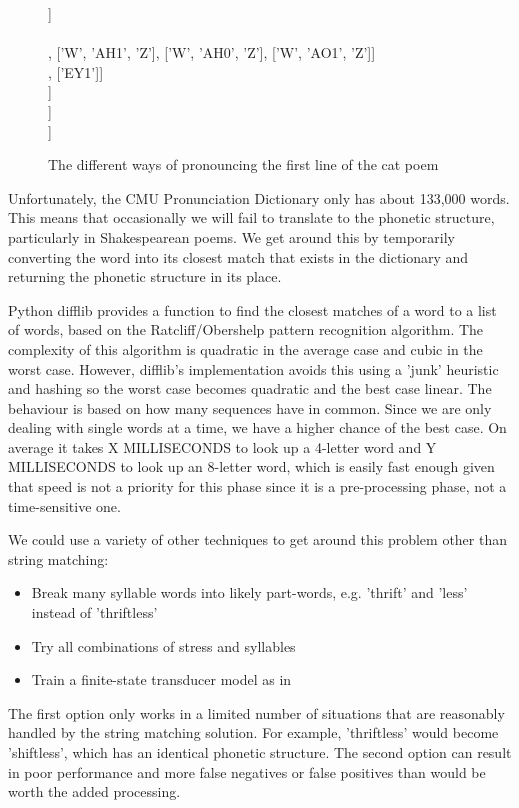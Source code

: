 \begin{figure}
\centering
[['DH', 'EH1', 'R']] \\
['W', 'AH1', 'N', 'S']\\
[['W', 'AA1', 'Z'], ['W', 'AH1', 'Z'], ['W', 'AH0', 'Z'], ['W', 'AO1', 'Z']]\\
[['AH0'], ['EY1']]\\
[['B', 'IH1', 'G']]\\
[['B', 'R', 'AW1', 'N']]\\
[['K', 'AE1', 'T']]
\caption{The different ways of pronouncing the first line of the cat poem}
\label{fig:catpronun}
\end{figure}

Unfortunately, the CMU Pronunciation Dictionary only has about 133,000 words. This means that occasionally we will fail to translate to the phonetic structure, particularly in Shakespearean poems. We get around this by temporarily converting the word into its closest match that exists in the dictionary and returning the phonetic structure in its place.

Python difflib provides a function to find the closest matches of a word to a list of words, based on the Ratcliff/Obershelp pattern recognition algorithm. The complexity of this algorithm is quadratic in the average case and cubic in the worst case. However, difflib's implementation avoids this using a 'junk' heuristic and hashing so the worst case becomes quadratic and the best case linear. The behaviour is based on  how many sequences have in common. Since we are only dealing with single words at a time, we have a higher chance of the best case. On average it takes X MILLISECONDS to look up a 4-letter word and Y MILLISECONDS to look up an 8-letter word, which is easily fast enough given that speed is not a priority for this phase since it is a pre-processing phase, not a time-sensitive one.

We could use a variety of other techniques to get around this problem other than string matching:
\begin{itemize}
\item{Break many syllable words into likely part-words, e.g. 'thrift' and 'less' instead of 'thriftless'}
\item{Try all combinations of stress and syllables}
\item{Train a finite-state transducer model as in \cite{dobrivsek2010towards}}
\end{itemize}

The first option only works in a limited number of situations that are reasonably handled by the string matching solution. For example, 'thriftless' would become 'shiftless', which has an identical phonetic structure. The second option can result in poor performance and more false negatives or false positives than would be worth the added processing.

